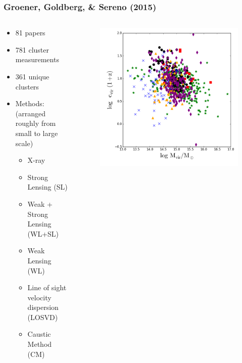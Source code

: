 \documentclass[hyperref={pdfpagelabels=false}]{beamer}
\newcommand{\bsquare}{\item[\color{myblue}\ding{110}]}
\newcommand{\psquare}{\item[\color{mypurple}\ding{110}]}
\newcommand{\rsquare}{\item[\color{myred}\ding{110}]}
\newcommand{\blsquare}{\item[\color{myblack}\ding{110}]}
\newcommand{\gsquare}{\item[\color{mygreen}\ding{110}]}
\newcommand{\ysquare}{\item[\color{myyellow}\ding{110}]}
\begin{document}
\begin{frame}
  \frametitle{Groener, Goldberg, \& Sereno (2015)}
  \begin{columns}
    \centering
    \begin{column}{0.5\textwidth}
      \begin{itemize}
      \item {\footnotesize 81 papers}
      \item {\footnotesize 781 cluster measurements}
      \item {\footnotesize 361 unique clusters}
      \item Methods: \\
        {\tiny (arranged roughly from small to large scale)}
        \begin{itemize}
          \gsquare{\footnotesize X-ray}
          \rsquare{\footnotesize Strong Lensing (SL)}
          \blsquare{\footnotesize Weak + Strong Lensing (WL+SL)}
          \psquare{\footnotesize Weak Lensing (WL)}
          \ysquare{\footnotesize Line of sight velocity dispersion (LOSVD)} 
          \bsquare{\footnotesize Caustic Method (CM)}
        \end{itemize}
      \end{itemize}
    \end{column}
    \begin{column}{0.5\textwidth}
      \begin{figure}
        \includegraphics[width=\textwidth]{CMRelation_FullSample_Symmetrized.png}
      \end{figure}
    \end{column}
  \end{columns}
\end{frame}
\end{document}
